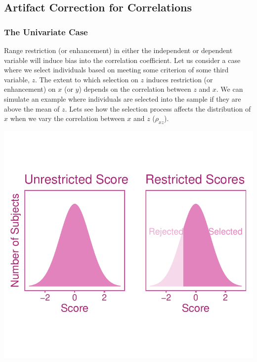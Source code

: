 \documentclass[
  letterpaper,
  DIV=11,
  numbers=noendperiod]{scrreprt}
\begin{document}
\hypertarget{artifact-correction-for-correlations-1}{%
\subsection{Artifact Correction for
Correlations}\label{artifact-correction-for-correlations-1}}

\hypertarget{the-univariate-case-2}{%
\subsubsection*{The Univariate Case}\label{the-univariate-case-2}}

Range restriction (or enhancement) in either the independent or
dependent variable will induce bias into the correlation coefficient.
Let us consider a case where we select individuals based on meeting some
criterion of some third variable, \(z\). The extent to which selection
on \(z\) induces restriction (or enhancement) on \(x\) (or \(y\))
depends on the correlation between \(z\) and \(x\). We can simulate an
example where individuals are selected into the sample if they are above
the mean of \(z\). Lets see how the selection process affects the
distribution of \(x\) when we vary the correlation between \(x\) and
\(z\) (\(\rho_{xz}\)).

\includegraphics{indirect_range_restriction_files/figure-pdf/unnamed-chunk-1-1.pdf}
\end{document}
